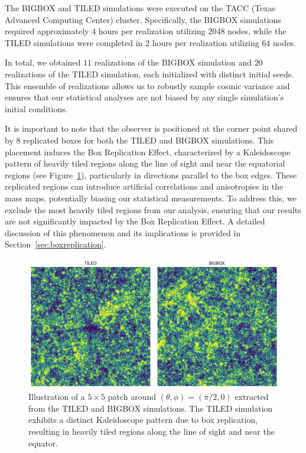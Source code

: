 The BIGBOX and TILED simulations were executed on the TACC (Texas Advanced Computing Center) cluster. Specifically, the BIGBOX simulations required approximately $4$ hours per realization utilizing $2048$ nodes, while the TILED simulations were completed in $2$ hours per realization utilizing $64$ nodes. 

In total, we obtained $11$ realizations of the BIGBOX simulation and $20$ realizations of the TILED simulation, each initialized with distinct initial seeds. This ensemble of realizations allows us to robustly sample cosmic variance and ensures that our statistical analyses are not biased by any single simulation's initial conditions. 

It is important to note that the observer is positioned at the corner point shared by $8$ replicated boxes for both the TILED and BIGBOX simulations. This placement induces the Box Replication Effect, characterized by a Kaleidoscope pattern of heavily tiled regions along the line of sight and near the equatorial regions (see Figure~\ref{fig:boxreplication_patch}), particularly in directions parallel to the box edges. These replicated regions can introduce artificial correlations and anisotropies in the mass maps, potentially biasing our statistical measurements. To address this, we exclude the most heavily tiled regions from our analysis, ensuring that our results are not significantly impacted by the Box Replication Effect. A detailed discussion of this phenomenon and its implications is provided in Section~\ref{sec:boxreplication}.

\begin{figure}[ht]
    \centering
    \includegraphics[width=\textwidth]{figures/samplepatch.png}
    \caption[Illustration of a $5 \times 5$ patch]{Illustration of a $5 \times 5$ patch around $(\theta, \phi)= (\pi/2, 0)$ extracted from the TILED and BIGBOX simulations. The TILED simulation exhibits a distinct Kaleidoscope pattern due to box replication, resulting in heavily tiled regions along the line of sight and near the equator.} 
    \label{fig:boxreplication_patch}
\end{figure}

